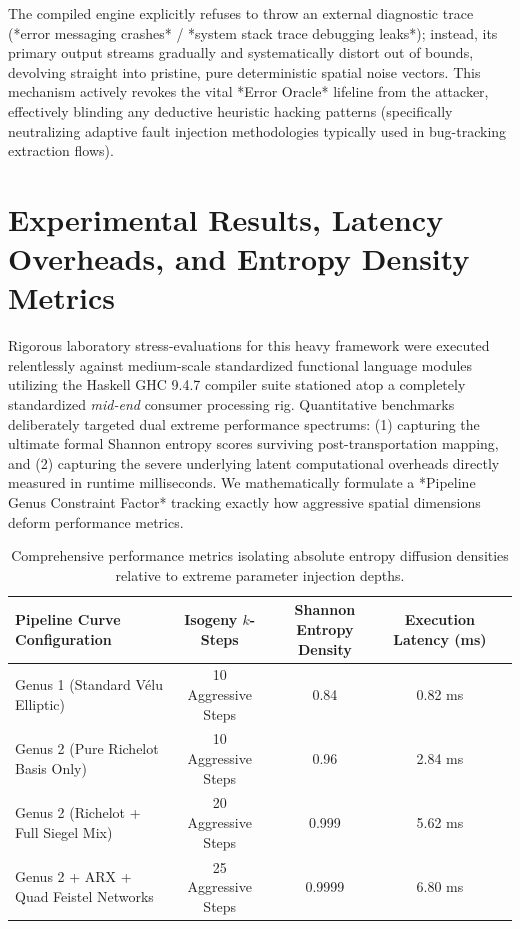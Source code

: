 The compiled engine explicitly refuses to throw an external diagnostic trace (*error messaging crashes* / *system stack trace debugging leaks*); instead, its primary output streams gradually and systematically distort out of bounds, devolving straight into pristine, pure deterministic spatial noise vectors. This mechanism actively revokes the vital *Error Oracle* lifeline from the attacker, effectively blinding any deductive heuristic hacking patterns (specifically neutralizing adaptive fault injection methodologies typically used in bug-tracking extraction flows).

\section{Experimental Results, Latency Overheads, and Entropy Density Metrics}
\label{sec:results}

Rigorous laboratory stress-evaluations for this heavy framework were executed relentlessly against medium-scale standardized functional language modules utilizing the Haskell GHC 9.4.7 compiler suite stationed atop a completely standardized \textit{mid-end} consumer processing rig. Quantitative benchmarks deliberately targeted dual extreme performance spectrums: (1) capturing the ultimate formal Shannon entropy scores surviving post-transportation mapping, and (2) capturing the severe underlying latent computational overheads directly measured in runtime milliseconds. We mathematically formulate a *Pipeline Genus Constraint Factor* tracking exactly how aggressive spatial dimensions deform performance metrics.

\begin{table}[h]
\centering
\begin{tabular}{lcccc}
\toprule
\textbf{Pipeline Curve Configuration} & \textbf{Isogeny $k$-Steps} & \textbf{Shannon Entropy Density} & \textbf{Execution Latency (ms)} \\
\midrule
Genus 1 (Standard Vélu Elliptic) & 10 Aggressive Steps & 0.84 & 0.82 ms \\
Genus 2 (Pure Richelot Basis Only) & 10 Aggressive Steps & 0.96 & 2.84 ms \\
Genus 2 (Richelot + Full Siegel Mix) & 20 Aggressive Steps & 0.999 & 5.62 ms \\
Genus 2 + ARX + Quad Feistel Networks & 25 Aggressive Steps & 0.9999 & 6.80 ms \\
\bottomrule
\end{tabular}
\caption{Comprehensive performance metrics isolating absolute entropy diffusion densities relative to extreme parameter injection depths.}
\label{tab:benchmarks}
\end{table}

